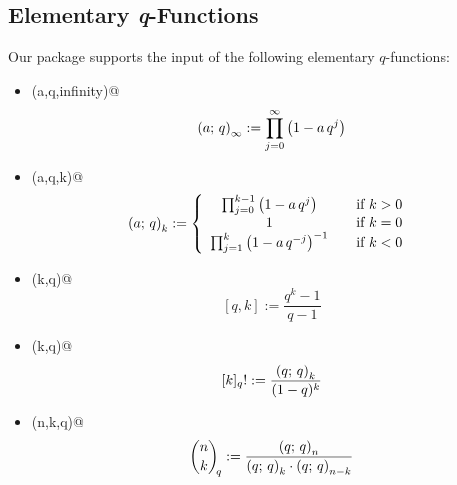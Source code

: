 \subsection{Elementary \textsl{q}-Functions}

Our package supports the input of the following elementary 
$q$-functions:
\begin{itemize}
%
\item {\verb@qpochhammer(a,q,infinity)@}\[
	\qfac{a}{\infty}:= \prod_{j=0}^{\infty}{\left(1-a\,q^j\right)}
	\]
\item {\verb@qpochhammer(a,q,k)@} \[
	\qfac{a}{k}:= 
         \left\{\begin{array}{ccc}
           \prod_{j=0}^{k-1}{\left(1-a\,q^j\right)} && \mbox{{if} $k>0$ } \\
           1 && \mbox{{if} $k=0$ } \\
           \prod_{j=1}^{k}{\left(1-a\,q^{-j}\right)^{-1}} && \mbox{{if} $k<0$ }
         \end{array}\right.
	\]
\item {\verb@qbrackets(k,q)@}
	\[  {}[q,k]:=\frac{q^k-1}{q-1}  \]
\item {\verb@qfactorial(k,q)@}
	\[   {}[k]_q!:= \frac{\qfac{q}{k}}{(1-q)^k}  \]
\item {\verb@qbinomial(n,k,q)@}
	\[  \qbinomial{n}{k}:=
		\frac{\qfac{q}{n}}{\qfac{q}{k}\cdot\qfac{q}{n-k}} \]
\end{itemize}

